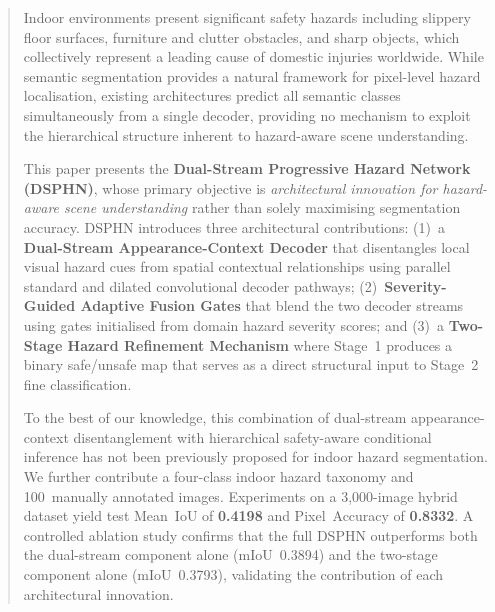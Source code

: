 \begin{abstract}
Indoor environments present significant safety hazards including
slippery floor surfaces, furniture and clutter obstacles, and sharp
objects, which collectively represent a leading cause of domestic
injuries worldwide. While semantic segmentation provides a natural
framework for pixel-level hazard localisation, existing architectures
predict all semantic classes simultaneously from a single decoder,
providing no mechanism to exploit the hierarchical structure inherent
to hazard-aware scene understanding.

This paper presents the \textbf{Dual-Stream Progressive Hazard Network
(DSPHN)}, whose primary objective is \textit{architectural innovation
for hazard-aware scene understanding} rather than solely maximising
segmentation accuracy. DSPHN introduces three architectural
contributions: (1)~a \textbf{Dual-Stream Appearance-Context Decoder}
that disentangles local visual hazard cues from spatial contextual
relationships using parallel standard and dilated convolutional
decoder pathways; (2)~\textbf{Severity-Guided Adaptive Fusion Gates}
that blend the two decoder streams using gates initialised from
domain hazard severity scores; and (3)~a \textbf{Two-Stage Hazard
Refinement Mechanism} where Stage~1 produces a binary safe/unsafe
map that serves as a direct structural input to Stage~2 fine
classification.

To the best of our knowledge, this combination of dual-stream
appearance-context disentanglement with hierarchical safety-aware
conditional inference has not been previously proposed for indoor
hazard segmentation. We further contribute a four-class indoor hazard
taxonomy and 100~manually annotated images. Experiments on a
3,000-image hybrid dataset yield test Mean~IoU of \textbf{0.4198}
and Pixel~Accuracy of \textbf{0.8332}. A controlled ablation study
confirms that the full DSPHN outperforms both the dual-stream
component alone (mIoU~0.3894) and the two-stage component alone
(mIoU~0.3793), validating the contribution of each architectural
innovation.
\end{abstract}
